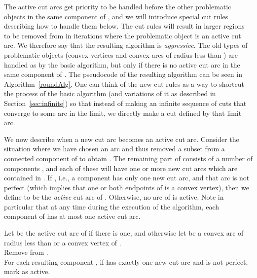 \documentclass{article}
\begin{document}
The active cut arcs get priority to be handled before the other problematic objects in the same component of , and we will introduce special cut rules describing how to handle them below.
The cut rules will result in larger regions  to be removed from  in iterations where the problematic object is an active cut arc.
We therefore say that the resulting algorithm is \emph{aggressive}.
The old types of problematic objects (convex vertices and convex arcs of radius less than ) are handled as by the basic algorithm, but only if there is no active cut arc in the same component of .
The pseudocode of the resulting algorithm can be seen in Algorithm~\ref{roundAlg}.
One can think of the new cut rules as a way to shortcut the process of the basic algorithm (and variations of it as described in Section~\ref{sec:infinite}) so that instead of making an infinite sequence of cuts that converge to some arc in the limit, we directly make a cut defined by that limit arc.

We now describe when a new cut arc becomes an active cut arc.
Consider the situation where we have chosen an arc  and thus removed a subset from a connected component  of  to obtain .
The remaining part of  consists of a number  of components , and each of these  will have one or more new cut arcs  which are contained in .
If , i.e., a component  has only one new cut arc, and that arc  is not perfect (which implies that one or both endpoints of  is a convex vertex), then we define  to be the \emph{active} cut arc of .
Otherwise, no arc of  is active.
Note in particular that at any time during the execution of the algorithm, each component of  has at most one active cut arc.

\begin{algorithm}[h]
\LinesNumbered
\DontPrintSemicolon
\SetArgSty{}
 {\label{loop}
  Let  be the active cut arc of  if there is one, and otherwise let  be a convex arc of radius less than  or a convex vertex of . \\
  Remove  from . \\
  For each resulting component , if  has exactly one new cut arc  and  is not perfect, mark  as active. \\
}
\Return {}
\caption{}
\label{roundAlg}
\end{algorithm}
\end{document}
